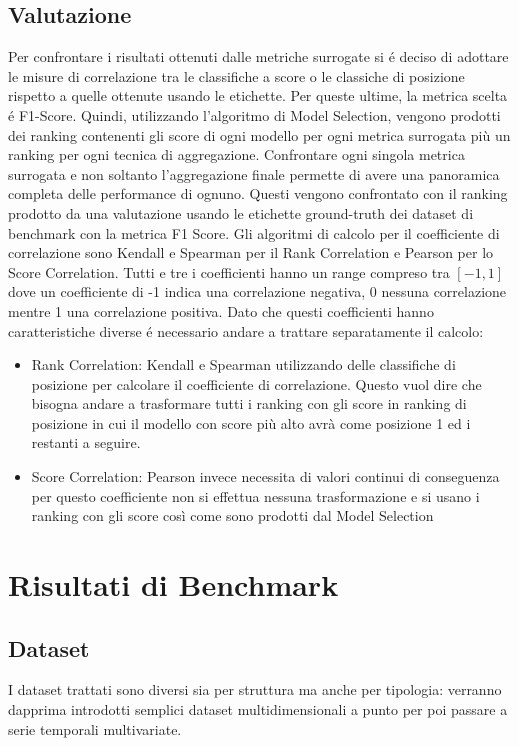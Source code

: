\subsection{Valutazione}
Per confrontare i risultati ottenuti dalle metriche surrogate si é deciso di adottare le misure di correlazione tra le classifiche a score o le classiche di posizione rispetto a quelle ottenute usando le etichette. Per queste ultime, la metrica scelta é F1-Score.
Quindi, utilizzando l'algoritmo di Model Selection, vengono prodotti dei ranking contenenti gli score di ogni modello per ogni metrica surrogata più un ranking per ogni tecnica di aggregazione. Confrontare ogni singola metrica surrogata e non soltanto l'aggregazione finale permette di avere una panoramica completa delle performance di ognuno.
Questi vengono confrontato con il ranking prodotto da una valutazione usando le etichette ground-truth dei dataset di benchmark con la metrica F1 Score.
Gli algoritmi di calcolo per il coefficiente di correlazione sono Kendall e Spearman per il Rank Correlation e Pearson per lo Score Correlation. Tutti e tre i coefficienti hanno un range compreso tra $[-1,1]$ dove un coefficiente di -1 indica una correlazione negativa, 0 nessuna correlazione mentre 1 una correlazione positiva. 
Dato che questi coefficienti hanno caratteristiche diverse é necessario andare a trattare separatamente il calcolo:
\begin{itemize}
	\item Rank Correlation: Kendall e Spearman utilizzando delle classifiche di posizione per calcolare il coefficiente di correlazione. Questo vuol dire che bisogna andare a trasformare tutti i ranking con gli score in ranking di posizione in cui il modello con score più alto avrà come posizione 1 ed i restanti a seguire.
	\item Score Correlation: Pearson invece necessita di valori continui di conseguenza per questo coefficiente non si effettua nessuna trasformazione e si usano i ranking con gli score così come sono prodotti dal Model Selection
\end{itemize}

 

\newpage
\section{Risultati di Benchmark}
\subsection{Dataset}
I dataset trattati sono diversi sia per struttura ma anche per tipologia: verranno dapprima introdotti semplici dataset multidimensionali a punto per poi passare a serie temporali multivariate. 


